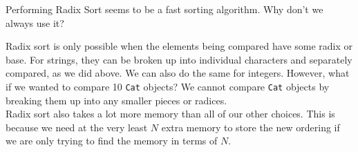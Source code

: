 \begin{blocksection}
\question Performing Radix Sort seems to be a fast sorting algorithm. Why don't
we always use it?

\begin{solution}[1in]
Radix sort is only possible when the elements being compared have some radix or
base. For strings, they can be broken up into individual characters and
separately compared, as we did above. We can also do the same for integers.
However, what if we wanted to compare 10 \lstinline$Cat$ objects? We cannot
compare \lstinline$Cat$ objects by breaking them up into any smaller pieces or
radices.\\
Radix sort also takes a lot more memory than all of our other choices. This is because we need at the very least $N$ extra memory to store the new ordering if we are only trying to find the memory in terms of $N$. 
\end{solution}
\end{blocksection}
